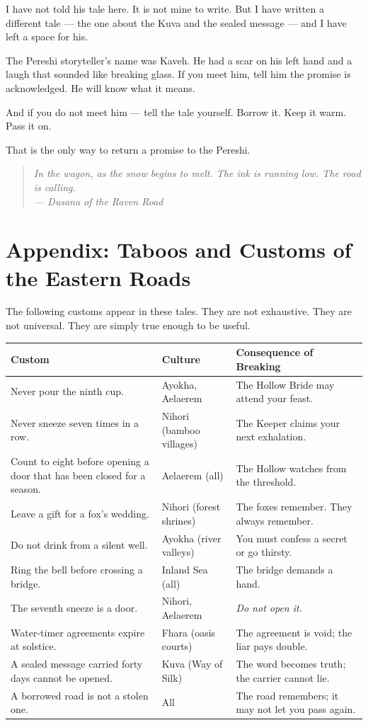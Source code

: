 \documentclass[10pt,twoside]{book}
\newcommand{\dusana}[1]{\begin{quote}\itshape #1 \\ --- Dusana of the Raven Road\end{quote}}
\begin{document}
I have not told his tale here. It is not mine to write. But I have written a different tale --- the one about the Kuva and the sealed message --- and I have left a space for his.

The Pereshi storyteller's name was Kaveh. He had a scar on his left hand and a laugh that sounded like breaking glass. If you meet him, tell him the promise is acknowledged. He will know what it means.

And if you do not meet him --- tell the tale yourself. Borrow it. Keep it warm. Pass it on.

That is the only way to return a promise to the Pereshi.

\dusana{In the wagon, as the snow begins to melt. The ink is running low. The road is calling.}

\chapter*{Appendix: Taboos and Customs of the Eastern Roads}

The following customs appear in these tales. They are not exhaustive. They are not universal. They are simply true enough to be useful.

\begin{table}[h]
\centering
\begin{tabularx}{\textwidth}{p{4cm} p{4cm} X}
\toprule
\textbf{Custom} & \textbf{Culture} & \textbf{Consequence of Breaking} \\
\midrule
Never pour the ninth cup. & Ayokha, Aelaerem & The Hollow Bride may attend your feast. \\
Never sneeze seven times in a row. & Nihori (bamboo villages) & The Keeper claims your next exhalation. \\
Count to eight before opening a door that has been closed for a season. & Aelaerem (all) & The Hollow watches from the threshold. \\
Leave a gift for a fox's wedding. & Nihori (forest shrines) & The foxes remember. They always remember. \\
Do not drink from a silent well. & Ayokha (river valleys) & You must confess a secret or go thirsty. \\
Ring the bell before crossing a bridge. & Inland Sea (all) & The bridge demands a hand. \\
The seventh sneeze is a door. & Nihori, Aelaerem & \textit{Do not open it.} \\
Water-timer agreements expire at solstice. & Fhara (oasis courts) & The agreement is void; the liar pays double. \\
A sealed message carried forty days cannot be opened. & Kuva (Way of Silk) & The word becomes truth; the carrier cannot lie. \\
A borrowed road is not a stolen one. & All & The road remembers; it may not let you pass again. \\
\bottomrule
\end{tabularx}
\end{table}
\end{document}
